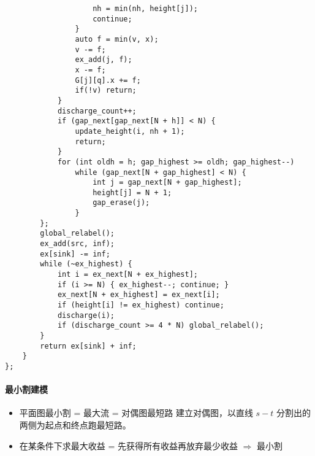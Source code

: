 \documentclass{ctexart}
\begin{document}
\begin{lstlisting}
                    nh = min(nh, height[j]);
                    continue;
                }
                auto f = min(v, x);
                v -= f;
                ex_add(j, f);
                x -= f;
                G[j][q].x += f;
                if(!v) return;
            }
            discharge_count++;
            if (gap_next[gap_next[N + h]] < N) {
                update_height(i, nh + 1);
                return;
            }
            for (int oldh = h; gap_highest >= oldh; gap_highest--)
                while (gap_next[N + gap_highest] < N) {
                    int j = gap_next[N + gap_highest];
                    height[j] = N + 1;
                    gap_erase(j);
                }
        };
        global_relabel();
        ex_add(src, inf);
        ex[sink] -= inf;
        while (~ex_highest) {
            int i = ex_next[N + ex_highest];
            if (i >= N) { ex_highest--; continue; }
            ex_next[N + ex_highest] = ex_next[i];
            if (height[i] != ex_highest) continue;
            discharge(i);
            if (discharge_count >= 4 * N) global_relabel();
        }
        return ex[sink] + inf;
    }
};
\end{lstlisting}

\paragraph{最小割建模}

\begin{itemize}
    \item 平面图最小割 = 最大流 = 对偶图最短路
          建立对偶图，以直线 $s - t$ 分割出的两侧为起点和终点跑最短路。
    \item 在某条件下求最大收益 = 先获得所有收益再放弃最少收益 $\Rightarrow$ 最小割
\end{itemize}
\end{document}

